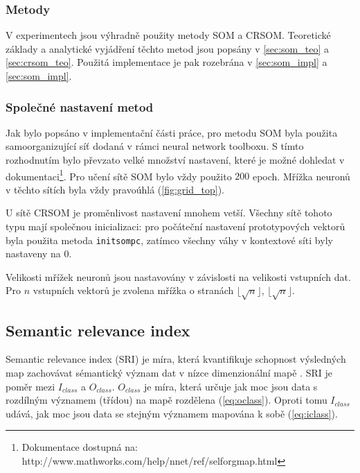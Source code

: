 \documentclass[thesis=M,czech]{FITthesis}[2012/06/26]
\begin{document}
\subsubsection*{Metody}
V experimentech jsou výhradně použity metody SOM a CRSOM. Teoretické základy a analytické vyjádření těchto metod jsou popsány v \ref{sec:som_teo} a \ref{sec:crsom_teo}. Použitá implementace je pak rozebrána v \ref{sec:som_impl} a \ref{sec:som_impl}. 



\subsubsection*{Společné nastavení metod}
Jak bylo popsáno v implementační části práce, pro metodu SOM byla použita samoorganizující síť dodaná v rámci neural network toolboxu. S tímto rozhodnutím bylo převzato velké množství nastavení, které je možné dohledat v dokumentaci\footnote{Dokumentace dostupná na: http://www.mathworks.com/help/nnet/ref/selforgmap.html}. Pro učení sítě SOM bylo vždy použito $200$ epoch. Mřížka neuronů v těchto sítích byla vždy pravoúhlá (\ref{fig:grid_top}).

U sítě CRSOM je proměnlivost nastavení mnohem vetší. Všechny sítě tohoto typu mají společnou inicializaci: pro počáteční nastavení prototypových vektorů byla použita metoda \texttt{initsompc}, zatímco všechny váhy v kontextové síti byly nastaveny na $0$.
\newcommand{\floor}[1]{\lfloor #1 \rfloor}

Velikosti mřížek neuronů jsou nastavovány v závislosti na velikosti vstupních dat.  Pro $n$ vstupních vektorů je zvolena mřížka o stranách $\floor{\sqrt{n}}$, $\floor{\sqrt{n}}$.




\subsection{Semantic relevance index}
Semantic relevance index (SRI) je míra, která kvantifikuje schopnost výsledných map zachovávat sémantický význam dat v nízce dimenzionální mapě \cite{hartono14}. SRI je poměr mezi $I_{class}$ a $O_{class}$. $O_{class}$ je míra, která určuje jak moc jsou data s rozdílným významem (třídou) na mapě rozdělena (\ref{eq:oclass}). Oproti tomu $I_{class}$ udává, jak moc jsou data se stejným významem mapována k sobě (\ref{eq:iclass}).
\end{document}
